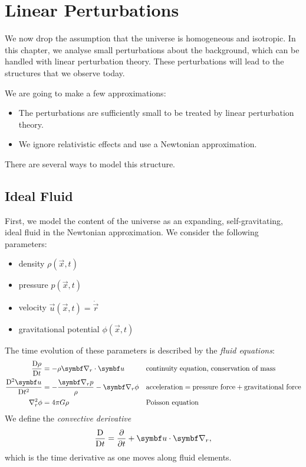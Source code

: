 \chapter{Linear Perturbations}

We now drop the assumption that the universe is homogeneous and isotropic. In this chapter, we analyse small perturbations about the background, which can be handled with linear perturbation theory. These perturbations will lead to the structures that we observe today.

We are going to make a few approximations:
\begin{itemize}
	\item The perturbations are sufficiently small to be treated by linear perturbation theory.
	\item We ignore relativistic effects and use a Newtonian approximation.
\end{itemize}

There are several ways to model this structure.

\section{Ideal Fluid}
First, we model the content of the universe as an expanding, self-gravitating, ideal fluid in the Newtonian approximation. We consider the following parameters:
\begin{itemize}
	\item density $\rho(\vec{x},t)$
	\item pressure $p(\vec{x},t)$
	\item velocity $\vec{u}(\vec{x},t) = \dot{\vec{r}}$
	\item gravitational potential $\phi(\vec{x},t)$
\end{itemize}
The time evolution of these parameters is described by the \emph{fluid equations}:
\begin{align*}
	\Dv{\rho}{t} &= - \rho \Grad_r \cdot \vec{u}
	&& \text{continuity equation, conservation of mass}\\
	\Dv{^2\vec{u}}{t^2} &= - \frac{\Grad_r p}{\rho} - \Grad_r \phi
	&&\text{acceleration} = \text{pressure force} + \text{gravitational force}\\
	\Lap_r \phi &= 4 \pi G \rho
	&&\text{Poisson equation}
\end{align*}
We define the \emph{convective derivative}
\begin{align*}
	\Dv{}{t} = \pdv{}{t} + \vec{u} \cdot \Grad_r,
\end{align*}
which is the time derivative as one moves along fluid elements.

